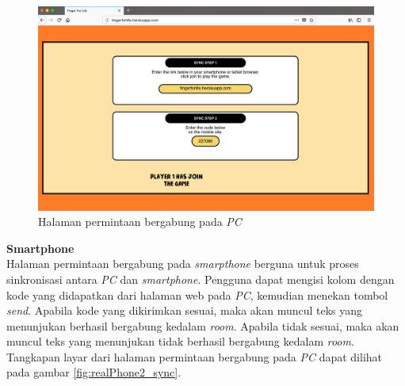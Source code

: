 \begin{enumerate}
	\begin{figure}[H]
		\centering
		\includegraphics[scale=0.25]{Gambar/realWeb2_sync}
		\caption{Halaman permintaan bergabung pada \textit{PC}}
		\label{fig:realWeb2_sync}
	\end{figure}
	
	
	\textbf{Smartphone} \\
	Halaman permintaan bergabung pada \textit{smarpthone} berguna untuk proses sinkronisasi antara \textit{PC} dan \textit{smartphone}. Pengguna dapat mengisi kolom dengan kode yang didapatkan dari halaman web pada \textit{PC}, kemudian menekan tombol \textit{send}. Apabila kode yang dikirimkan sesuai, maka akan muncul teks yang menunjukan berhasil bergabung kedalam \textit{room}. Apabila tidak sesuai, maka akan muncul teks yang menunjukan tidak berhasil bergabung kedalam \textit{room}. Tangkapan layar dari halaman permintaan bergabung pada \textit{PC} dapat dilihat pada gambar \ref{fig:realPhone2_sync}.
	

\end{enumerate}
